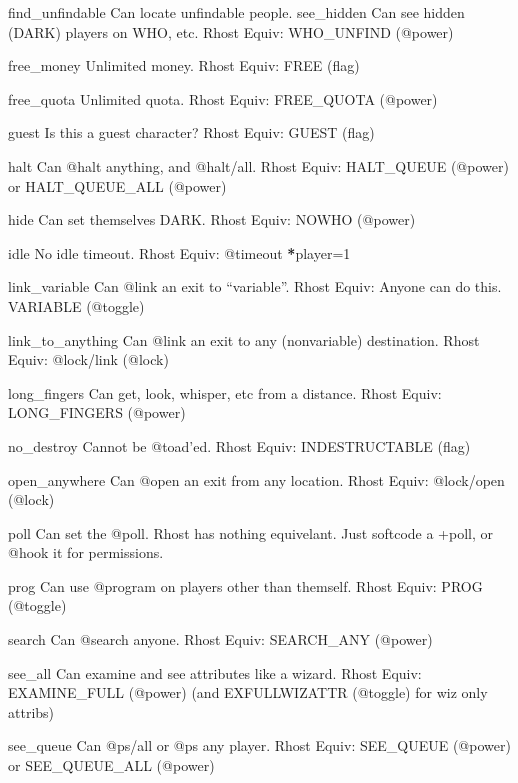 \documentclass[letterpaper,10pt,english]{sphinxmanual}
\begin{document}
\sphinxAtStartPar
find\_unfindable       Can locate unfindable people.
see\_hidden            Can see hidden (DARK) players on WHO, etc.
Rhost Equiv: WHO\_UNFIND (@power)

\sphinxAtStartPar
free\_money            Unlimited money.
Rhost Equiv: FREE (flag)

\sphinxAtStartPar
free\_quota            Unlimited quota.
Rhost Equiv: FREE\_QUOTA (@power)

\sphinxAtStartPar
guest                 Is this a guest character?
Rhost Equiv: GUEST (flag)

\sphinxAtStartPar
halt                  Can @halt anything, and @halt/all.
Rhost Equiv: HALT\_QUEUE (@power) or HALT\_QUEUE\_ALL (@power)

\sphinxAtStartPar
hide                  Can set themselves DARK.
Rhost Equiv: NOWHO (@power)

\sphinxAtStartPar
idle                  No idle timeout.
Rhost Equiv: @timeout {\color{red}\bfseries{}*}player=\sphinxhyphen{}1

\sphinxAtStartPar
link\_variable         Can @link an exit to “variable”.
Rhost Equiv: Anyone can do this.  VARIABLE (@toggle)

\sphinxAtStartPar
link\_to\_anything      Can @link an exit to any (non\sphinxhyphen{}variable) destination.
Rhost Equiv: @lock/link (@lock)

\sphinxAtStartPar
long\_fingers          Can get, look, whisper, etc from a distance.
Rhost Equiv: LONG\_FINGERS (@power)

\sphinxAtStartPar
no\_destroy            Cannot be @toad’ed.
Rhost Equiv: INDESTRUCTABLE (flag)

\sphinxAtStartPar
open\_anywhere         Can @open an exit from any location.
Rhost Equiv: @lock/open (@lock)

\sphinxAtStartPar
poll                  Can set the @poll.
Rhost has nothing equivelant.  Just softcode a +poll, or @hook it for permissions.

\sphinxAtStartPar
prog                  Can use @program on players other than themself.
Rhost Equiv: PROG (@toggle)

\sphinxAtStartPar
search                Can @search anyone.
Rhost Equiv: SEARCH\_ANY (@power)

\sphinxAtStartPar
see\_all               Can examine and see attributes like a wizard.
Rhost Equiv: EXAMINE\_FULL (@power) (and EXFULLWIZATTR (@toggle) for wiz only attribs)

\sphinxAtStartPar
see\_queue             Can @ps/all or @ps any player.
Rhost Equiv: SEE\_QUEUE (@power) or SEE\_QUEUE\_ALL (@power)
\end{document}
